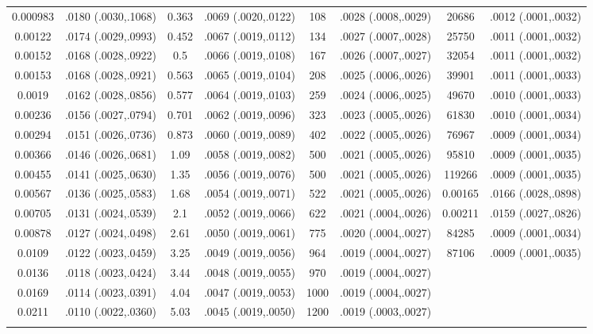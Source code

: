 \begin{longtable}{cccccccc}
  0.000983 & .0180 (.0030,.1068) & 0.363 & .0069 (.0020,.0122) & 108 & .0028 (.0008,.0029) & 20686 & .0012 (.0001,.0032) \\ 
  0.00122 & .0174 (.0029,.0993) & 0.452 & .0067 (.0019,.0112) & 134 & .0027 (.0007,.0028) & 25750 & .0011 (.0001,.0032) \\ 
  0.00152 & .0168 (.0028,.0922) & 0.5 & .0066 (.0019,.0108) & 167 & .0026 (.0007,.0027) & 32054 & .0011 (.0001,.0032) \\ 
  0.00153 & .0168 (.0028,.0921) & 0.563 & .0065 (.0019,.0104) & 208 & .0025 (.0006,.0026) & 39901 & .0011 (.0001,.0033) \\ 
  0.0019 & .0162 (.0028,.0856) & 0.577 & .0064 (.0019,.0103) & 259 & .0024 (.0006,.0025) & 49670 & .0010 (.0001,.0033) \\ 
  0.00236 & .0156 (.0027,.0794) & 0.701 & .0062 (.0019,.0096) & 323 & .0023 (.0005,.0026) & 61830 & .0010 (.0001,.0034) \\ 
  0.00294 & .0151 (.0026,.0736) & 0.873 & .0060 (.0019,.0089) & 402 & .0022 (.0005,.0026) & 76967 & .0009 (.0001,.0034) \\ 
  0.00366 & .0146 (.0026,.0681) & 1.09 & .0058 (.0019,.0082) & 500 & .0021 (.0005,.0026) & 95810 & .0009 (.0001,.0035) \\ 
  0.00455 & .0141 (.0025,.0630) & 1.35 & .0056 (.0019,.0076) & 500 & .0021 (.0005,.0026) & 119266 & .0009 (.0001,.0035) \\ 
  0.00567 & .0136 (.0025,.0583) & 1.68 & .0054 (.0019,.0071) & 522 & .0021 (.0005,.0026) & 0.00165 & .0166 (.0028,.0898) \\ 
  0.00705 & .0131 (.0024,.0539) & 2.1 & .0052 (.0019,.0066) & 622 & .0021 (.0004,.0026) & 0.00211 & .0159 (.0027,.0826) \\ 
  0.00878 & .0127 (.0024,.0498) & 2.61 & .0050 (.0019,.0061) & 775 & .0020 (.0004,.0027) & 84285 & .0009 (.0001,.0034) \\ 
  0.0109 & .0122 (.0023,.0459) & 3.25 & .0049 (.0019,.0056) & 964 & .0019 (.0004,.0027) & 87106 & .0009 (.0001,.0035) \\ 
  0.0136 & .0118 (.0023,.0424) & 3.44 & .0048 (.0019,.0055) & 970 & .0019 (.0004,.0027) &  &  \\ 
  0.0169 & .0114 (.0023,.0391) & 4.04 & .0047 (.0019,.0053) & 1000 & .0019 (.0004,.0027) &  &  \\ 
  0.0211 & .0110 (.0022,.0360) & 5.03 & .0045 (.0019,.0050) & 1200 & .0019 (.0003,.0027) &  &  \\ 
   \hline
\hline
\label{tab marginalized_risks_eq 1}
\end{longtable}
